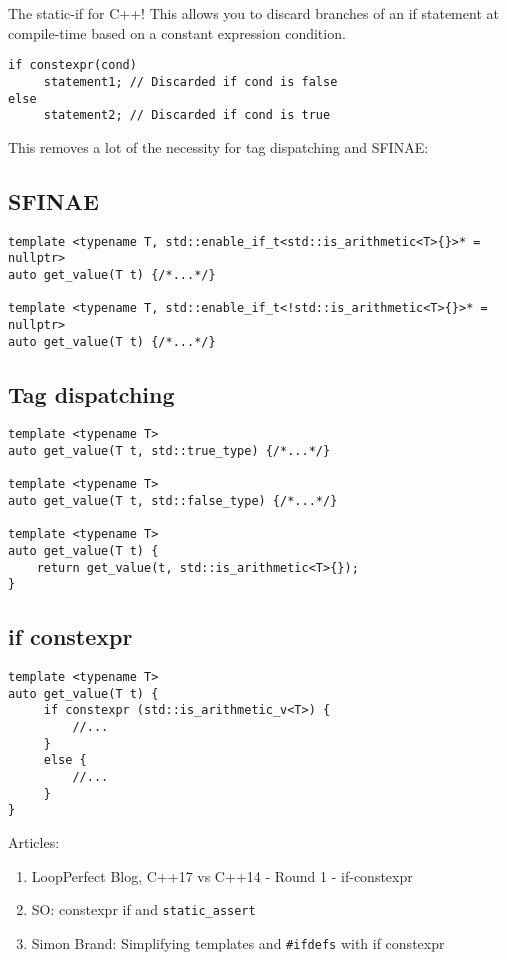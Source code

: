 The static-if for C++! This allows you to discard branches of an if statement at compile-time based on a constant expression condition.
\begin{verbatim}
if constexpr(cond)
     statement1; // Discarded if cond is false
else
     statement2; // Discarded if cond is true
\end{verbatim}
     
This removes a lot of the necessity for tag dispatching and SFINAE:

\subsection{SFINAE}

\begin{verbatim}
template <typename T, std::enable_if_t<std::is_arithmetic<T>{}>* = nullptr>
auto get_value(T t) {/*...*/}

template <typename T, std::enable_if_t<!std::is_arithmetic<T>{}>* = nullptr>
auto get_value(T t) {/*...*/}
\end{verbatim}

\subsection{Tag dispatching}

\begin{verbatim}
template <typename T>
auto get_value(T t, std::true_type) {/*...*/}

template <typename T>
auto get_value(T t, std::false_type) {/*...*/}

template <typename T>
auto get_value(T t) {
    return get_value(t, std::is_arithmetic<T>{}); 
}
\end{verbatim}

\subsection{if constexpr}

\begin{verbatim}
template <typename T>
auto get_value(T t) {
     if constexpr (std::is_arithmetic_v<T>) {
         //...
     }
     else {
         //...
     }
}
\end{verbatim}

Articles:
\begin{enumerate}
\item LoopPerfect Blog, C++17 vs C++14 - Round 1 - if-constexpr
\item SO: constexpr if and \texttt{static_assert}
\item Simon Brand: Simplifying templates and \texttt{#ifdefs} with if constexpr
\end{enumerate}

